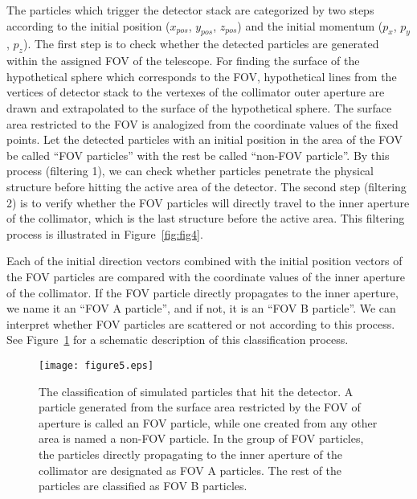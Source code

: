 \documentclass{jkas}
\begin{document}
The particles which trigger the detector stack are categorized by two steps according to the initial position ($x_{pos}$, $y_{pos}$, $z_{pos}$) and the initial momentum ($p_x$, $p_y$, $p_z$). The first step is to check whether the detected particles are generated within the assigned FOV of the telescope. For finding the surface of the hypothetical sphere which corresponds to the FOV, hypothetical lines from the vertices of detector stack to the vertexes of the collimator outer aperture are drawn and extrapolated to the surface of the hypothetical sphere. The surface area restricted to the FOV is analogized from the coordinate values of the fixed points. Let the detected particles with an initial position in the area of the FOV be called ``FOV particles'' with the rest be called ``non-FOV particle''. By this process (filtering 1), we can check whether particles penetrate the physical structure before hitting the active area of the detector. The second step (filtering 2) is to verify whether the FOV particles will directly travel to the inner aperture of the collimator, which is the last structure before the active area. This filtering process is illustrated in Figure~\ref{fig:fig4}.

Each of the initial direction vectors combined with the initial position vectors of the FOV particles are compared with the coordinate values of the inner aperture of the collimator. If the FOV particle directly propagates to the inner aperture, we name it an ``FOV A particle'', and if not, it is an ``FOV B particle''. We can interpret whether FOV particles are scattered or not according to this process. See Figure~\ref{fig:fig5} for a schematic description of this classification process.

\begin{figure}[t!]
\centering
\texttt{[image: figure5.eps]}
\caption{The classification of simulated particles that hit the detector. A particle generated from the surface area restricted by the FOV of aperture is called an FOV particle, while one created from any other area is named a non-FOV particle. In the group of FOV particles, the particles directly propagating to the inner aperture of the collimator are designated as FOV A particles. The rest of the particles are classified as FOV B particles.\label{fig:fig5}}
\end{figure}
\end{document}
